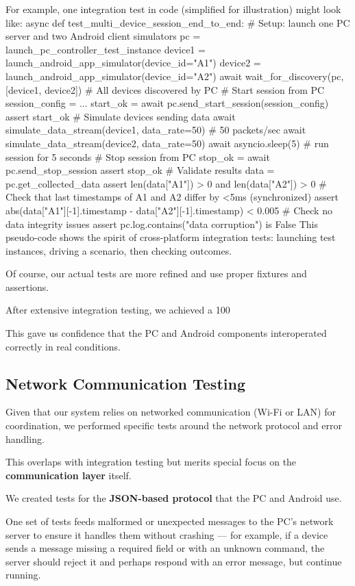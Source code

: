 {{{For example, one integration test in code (simplified for illustration) might look like: async def test_multi_device_session_end_to_end: # Setup: launch one PC server and two Android client simulators pc = launch_pc_controller_test_instance device1 = launch_android_app_simulator(device_id="A1") device2 = launch_android_app_simulator(device_id="A2") await wait_for_discovery(pc, [device1, device2]) # All devices discovered by PC # Start session from PC session_config = {...} start_ok = await pc.send_start_session(session_config) assert start_ok # Simulate devices sending data await simulate_data_stream(device1, data_rate=50) # 50 packets/sec await simulate_data_stream(device2, data_rate=50) await asyncio.sleep(5) # run session for 5 seconds # Stop session from PC stop_ok = await pc.send_stop_session assert stop_ok # Validate results data = pc.get_collected_data assert len(data["A1"]) > 0 and len(data["A2"]) > 0 # Check that last timestamps of A1 and A2 differ by <5ms (synchronized) assert abs(data["A1"][-1].timestamp - data["A2"][-1].timestamp) < 0.005 # Check no data integrity issues assert pc.log.contains("data corruption") is False This pseudo-code shows the spirit of cross-platform integration tests: launching test instances, driving a scenario, then checking outcomes.

Of course, our actual tests are more refined and use proper fixtures and assertions.

After extensive integration testing, we achieved a 100%

This gave us confidence that the PC and Android components interoperated correctly in real conditions.

\subsection{Network Communication Testing}

Given that our system relies on networked communication (Wi-Fi or LAN) for coordination, we performed specific tests around the network protocol and error handling.

This overlaps with integration testing but merits special focus on the \textbf{communication layer}
 itself.

We created tests for the \textbf{JSON-based protocol}
 that the PC and Android use.

One set of tests feeds malformed or unexpected messages to the PC's network server to ensure it handles them without crashing --- for example, if a device sends a message missing a required field or with an unknown command, the server should reject it and perhaps respond with an error message, but continue running.

}}}
